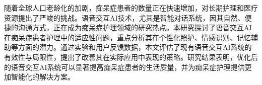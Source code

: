 
\begin{cabstract}

随着全球人口老龄化的加剧，痴呆症患者的数量正在快速增加，对长期护理和医疗资源提出了严峻的挑战。语音交互AI技术，尤其是智能对话系统，因其自然、便捷的沟通方式，正在成为痴呆症护理领域的研究热点。本研究探讨了语音交互AI在痴呆症患者护理中的适应性问题，重点分析其在个性化照护、情感识别、记忆辅助等方面的潜力。通过实验和用户反馈数据，本文评估了现有语音交互AI系统的有效性与局限性，提出了改善其在实际应用中表现的策略。研究结果表明，优化后的语音交互AI系统可以显著提高痴呆症患者的生活质量，并为痴呆症护理提供更加智能化的解决方案。

\end{cabstract}

